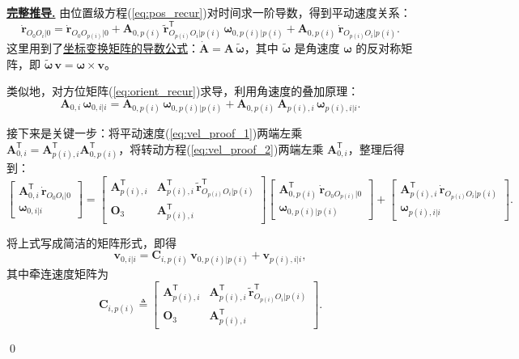 \documentclass[10pt,a4paper]{book}
\theoremstyle{thmstyle}
\theoremstyle{defstyle}
\theoremstyle{prostyle}
\renewenvironment{proof}[1][证明]{\par{\kaishu \underline{\textbf{#1.}}} \;\fangsong}{\qed\par}
\newcommand{\T}{^{\mathsf{T}}}
\renewcommand{\vec}[1]{\bm{#1}}
\newcommand{\mat}[1]{\bm{#1}}
\newcommand{\tildev}[1]{\tilde{#1}}
\begin{document}
\begin{proof}[完整推导]
  由位置级方程(\ref{eq:pos_recur})对时间求一阶导数，得到平动速度关系：
  \begin{equation}
  \dot{\vec{r}}_{O_0O_i|0} = \dot{\vec{r}}_{O_0O_{p(i)}|0}
  + \mat{A}_{0,p(i)}\,\tildev{\vec{r}}_{O_{p(i)}O_i|p(i)}\T\,\vec{\omega}_{0,p(i)|p(i)}
  + \mat{A}_{0,p(i)}\,\dot{\vec{r}}_{O_{p(i)}O_i|p(i)}.
  \label{eq:vel_proof_1}
  \end{equation}
  这里用到了\underline{坐标变换矩阵的导数公式}：$\dot{\mat{A}} = \mat{A}\,\widetilde{\vec{\omega}}$，其中 $\widetilde{\vec{\omega}}$ 是角速度 $\vec{\omega}$ 的反对称矩阵，即 $\widetilde{\vec{\omega}}\,\vec{v} = \vec{\omega}\times \vec{v}$。

  类似地，对方位矩阵(\ref{eq:orient_recur})求导，利用角速度的叠加原理：
  \begin{equation}
  \mat{A}_{0,i}\,\vec{\omega}_{0,i|i} = \mat{A}_{0,p(i)}\,\vec{\omega}_{0,p(i)|p(i)}
  + \mat{A}_{0,p(i)}\,\mat{A}_{p(i),i}\,\vec{\omega}_{p(i),i|i}.
  \label{eq:vel_proof_2}
  \end{equation}

  接下来是关键一步：将平动速度(\ref{eq:vel_proof_1})两端左乘 $\mat{A}_{0,i}\T = \mat{A}_{p(i),i}\T\mat{A}_{0,p(i)}\T$，将转动方程(\ref{eq:vel_proof_2})两端左乘 $\mat{A}_{0,i}\T$，整理后得到：
  \begin{equation}
  \begin{bmatrix}
  \mat{A}_{0,i}\T\,\dot{\vec{r}}_{O_0O_i|0} \\
  \vec{\omega}_{0,i|i}
  \end{bmatrix}
  =
  \begin{bmatrix}
  \mat{A}_{p(i),i}\T & \mat{A}_{p(i),i}\T\,\tildev{\vec{r}}_{O_{p(i)}O_i|p(i)}\T \\[4pt]
  \mat{O}_3 & \mat{A}_{p(i),i}\T
  \end{bmatrix}
  \begin{bmatrix}
  \mat{A}_{0,p(i)}\T\,\dot{\vec{r}}_{O_0O_{p(i)}|0} \\
  \vec{\omega}_{0,p(i)|p(i)}
  \end{bmatrix}
  +
  \begin{bmatrix}
  \mat{A}_{p(i),i}\T\,\dot{\vec{r}}_{O_{p(i)}O_i|p(i)} \\
  \vec{\omega}_{p(i),i|i}
  \end{bmatrix}.
  \end{equation}

  将上式写成简洁的矩阵形式，即得
  \[
  \vec{v}_{0,i|i} = \mat{C}_{i,p(i)}\,\vec{v}_{0,p(i)|p(i)} + \vec{v}_{p(i),i|i},
  \]
  其中牵连速度矩阵为
  \begin{equation}
  \mat{C}_{i,p(i)} \triangleq
  \begin{bmatrix}
  \mat{A}_{p(i),i}\T & \mat{A}_{p(i),i}\T\,\tildev{\vec{r}}_{O_{p(i)}O_i|p(i)}\T \\[4pt]
  \mat{O}_3 & \mat{A}_{p(i),i}\T
  \end{bmatrix}.
  \label{eq:C_matrix}
  \end{equation}


\end{proof}
\end{document}
